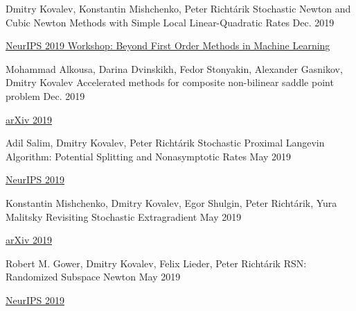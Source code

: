 
\begin{cventries}
	
\cventry
{Dmitry Kovalev, Konstantin Mishchenko, Peter Richtárik} %
{Stochastic Newton and Cubic Newton Methods with Simple Local Linear-Quadratic Rates} %
{} %
{Dec. 2019} %
{ %
	\begin{cvitems}
		\item {\href{https://drive.google.com/file/d/12aISV2e5XZGDxkr_wg9ILoC27HqoYJsV/view}{NeurIPS 2019 Workshop: Beyond First Order Methods in Machine Learning}}
	\end{cvitems}
}	

\cventry
{Mohammad Alkousa, Darina Dvinskikh, Fedor Stonyakin, Alexander Gasnikov, Dmitry Kovalev} %
{Accelerated methods for composite non-bilinear saddle point problem} %
{} %
{Dec. 2019} %
{ %
	\begin{cvitems}
		\item {\href{https://arxiv.org/abs/1906.03620}{arXiv 2019}}
	\end{cvitems}
}	

\cventry
{Adil Salim, Dmitry Kovalev, Peter Richtárik} %
{Stochastic Proximal Langevin Algorithm: Potential Splitting and Nonasymptotic Rates} %
{} %
{May 2019} %
{ %
	\begin{cvitems}
		\item {\href{https://papers.nips.cc/paper/8891-stochastic-proximal-langevin-algorithm-potential-splitting-and-nonasymptotic-rates}{NeurIPS 2019}}
	\end{cvitems}
}	
	
\cventry
{Konstantin Mishchenko, Dmitry Kovalev, Egor Shulgin, Peter Richtárik, Yura Malitsky} %
{Revisiting Stochastic Extragradient} %
{} %
{May 2019} %
{ %
	\begin{cvitems}
		\item {\href{https://arxiv.org/abs/1905.11373}{arXiv 2019}}
	\end{cvitems}
}

\cventry
{Robert M. Gower, Dmitry Kovalev, Felix Lieder, Peter Richtárik} %
{RSN: Randomized Subspace Newton} %
{} %
{May 2019} %
{ %
	\begin{cvitems}
		\item {\href{https://papers.nips.cc/paper/8351-rsn-randomized-subspace-newton}{NeurIPS 2019}}
	\end{cvitems}
}


\end{cventries}
